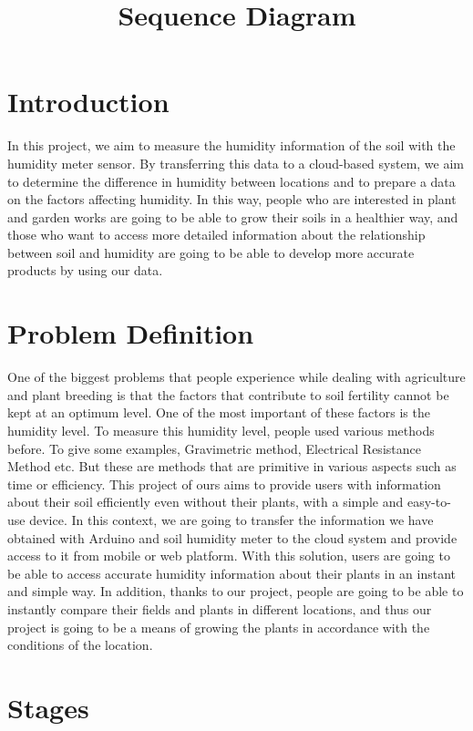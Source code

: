 \documentclass[14pt]{article}
\begin{document}
\section{Introduction}
In this project, we aim to measure the humidity information of the soil with the humidity meter sensor. By transferring this data to a cloud-based system, we aim to determine the difference in humidity between locations and to prepare a data on the factors affecting humidity. In this way, people who are interested in plant and garden works are going to be able to grow their soils in a healthier way, and those who want to access more detailed information about the relationship between soil and humidity are going to be able to develop more accurate products by using our data.

\section{Problem Definition}
One of the biggest problems that people experience while dealing with agriculture and plant breeding is that the factors that contribute to soil fertility cannot be kept at an optimum level. One of the most important of these factors is the humidity level. To measure this humidity level, people used various methods before. To give some examples, Gravimetric method, Electrical Resistance Method etc. But these are methods that are primitive in various aspects such as time or efficiency. This project of ours aims to provide users with information about their soil efficiently even without their plants, with a simple and easy-to-use device. In this context, we are going to transfer the information we have obtained with Arduino and soil humidity meter to the cloud system and provide access to it from mobile or web platform. With this solution, users are going to be able to access accurate humidity information about their plants in an instant and simple way. In addition, thanks to our project, people are going to be able to instantly compare their fields and plants in different locations, and thus our project is going to be a means of growing the plants in accordance with the conditions of the location.



\section{Stages}

\title{Sequence Diagram} 
\end{document}
